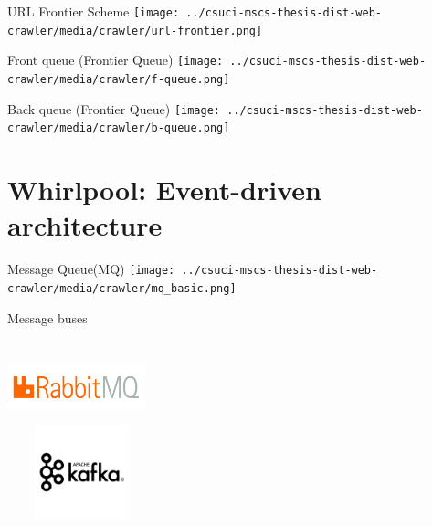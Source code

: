 \documentclass[9pt]{beamer}
\begin{document}

\begin{frame}{URL Frontier Scheme}
  \centering
  \texttt{[image: ../csuci-mscs-thesis-dist-web-crawler/media/crawler/url-frontier.png]}
\end{frame}


\begin{frame}{Front queue (Frontier Queue)}
  \centering
  \texttt{[image: ../csuci-mscs-thesis-dist-web-crawler/media/crawler/f-queue.png]}
\end{frame}


\begin{frame}{Back queue (Frontier Queue)}
  \centering
  \texttt{[image: ../csuci-mscs-thesis-dist-web-crawler/media/crawler/b-queue.png]}
\end{frame}


\section[Event-driven]{Whirlpool: Event-driven architecture}
\begin{frame}[plain]
\end{frame}


\begin{frame}{Message Queue(MQ)}
  \centering
  \texttt{[image: ../csuci-mscs-thesis-dist-web-crawler/media/crawler/mq\_basic.png]}
\end{frame}


\begin{frame}{Message buses}
  \begin{columns}[t]
    \centering
    \includegraphics[width=4cm,height=2cm]{img/rmq.png}\\
    \vrule{}
    \centering
    \includegraphics[width=4.3cm,height=2.7cm]{img/kafka.png}\\
  \end{columns}
\end{frame}
\end{document}

